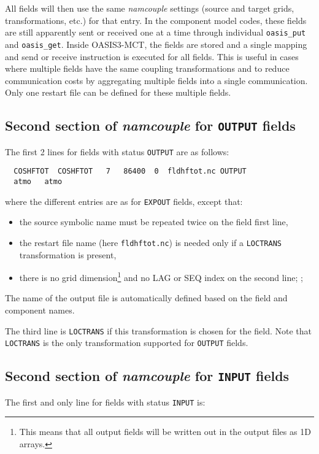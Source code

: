 All fields will then use the same
{\it namcouple} settings (source and target grids, transformations, etc.) for that entry. In the component model codes,
these fields are still apparently sent or received one at a
time through individual {\tt oasis\_put} and {\tt oasis\_get}. Inside OASIS3-MCT, the fields are stored and a single mapping
and send or receive instruction is executed for all fields. This is
useful in cases where multiple fields have the same coupling
transformations and to reduce communication costs by aggregating multiple 
fields into a single communication. Only one restart file can be
defined for these multiple fields. 

\subsection{Second section of {\it namcouple} for {\tt OUTPUT} fields}
\label{subsubsec_secondOUTPUT}
The first 2 lines for fields with status {\tt OUTPUT} are as follows:
  \begin{verbatim}
  COSHFTOT  COSHFTOT   7   86400  0  fldhftot.nc OUTPUT 
  atmo   atmo 
\end{verbatim}
where the different entries are as for {\tt EXPOUT} fields, except
that:
\begin{itemize}
\item the source symbolic name must be repeated twice on the field
  first line,
\item the restart file name (here {\tt fldhftot.nc}) is needed only if
  a {\tt LOCTRANS} transformation is present,
\item there is no grid dimension\footnote{This means that all output
    fields will be written out in the output files as 1D arrays.} and no LAG or SEQ
  index on the second line; ;
\end{itemize}
The name of the output file is automatically defined based on the
field and component names.

The third line is {\tt LOCTRANS} if this transformation is chosen for
the field. Note that {\tt LOCTRANS} is the only transformation
supported for {\tt OUTPUT} fields.

\subsection{Second section of {\it namcouple} for {\tt INPUT} fields}
\label{subsubsec_secondINPUT}

The first and only line for fields with status {\tt INPUT} is:


